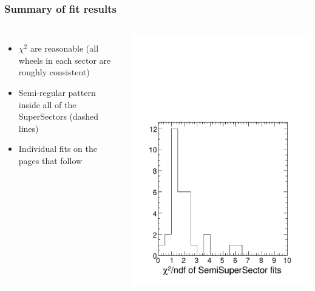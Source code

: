 \documentclass[compress]{beamer}
\begin{document}
\begin{frame}
\frametitle{Summary of fit results}
\label{summary}

\vspace{-0.75 cm}
\begin{columns}
\vspace{0.5 cm}
\begin{itemize}
\item $\chi^2$ are reasonable (all wheels in each sector are roughly consistent)
\item Semi-regular pattern inside all of the SuperSectors (dashed lines)
\item Individual fits on the pages that follow
\end{itemize}
\includegraphics[width=\linewidth]{zfits_chi2.pdf}
\end{columns}


\end{frame}
\end{document}
